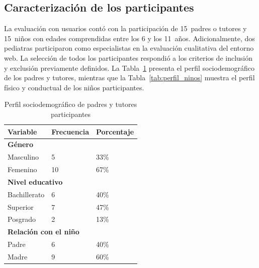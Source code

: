 			\subsection{Caracterización de los participantes}
			\label{subsec:caract}
				La evaluación con usuarios contó con la participación de 15~padres o tutores y 15~niños con edades comprendidas entre los 6 y los 11~años. Adicionalmente, dos pediatras participaron como especialistas en la evaluación cualitativa del entorno web. La selección de todos los participantes respondió a los criterios de inclusión y exclusión previamente definidos. La Tabla~\ref{tab:perfil_padres} presenta el perfil sociodemográfico de los padres y tutores, mientras que la Tabla~\ref{tab:perfil_ninos} muestra el perfil físico y conductual de los niños participantes.
				
				\begin{table}[H]
					\centering\small
					\caption{Perfil sociodemográfico de padres y tutores participantes}
					\label{tab:perfil_padres}
					\begin{tabular}{p{5cm}p{2.8cm}p{2.8cm}}
						\hline
						\textbf{Variable} & \textbf{Frecuencia} & \textbf{Porcentaje}\\
						\hline
						\multicolumn{3}{l}{\textbf{Género}}\\
						
						Masculino & 5  & 33\% \\
						Femenino  & 10 & 67\% \\
						\multicolumn{3}{l}{\textbf{Nivel educativo}}\\
						
						Bachillerato & 6 & 40\% \\
						Superior     & 7 & 47\% \\
						Posgrado     & 2 & 13\% \\
						\multicolumn{3}{l}{\textbf{Relación con el niño}}\\
						
						Padre & 6 & 40\% \\
						Madre & 9 & 60\% \\
						
					\end{tabular}
				\end{table}
				\tblnote
				
